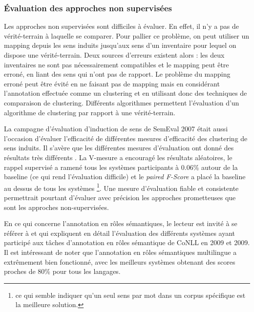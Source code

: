 \subsubsection{Évaluation des approches non supervisées}
\label{sec:evalunsupervised}

Les approches non supervisées sont difficiles à évaluer. En effet, il n'y a pas
de vérité-terrain à laquelle se comparer. Pour pallier ce problème, on peut
utiliser un mapping depuis les sens induits jusqu'aux sens d'un inventaire pour
lequel on dispose une vérité-terrain. Deux sources d'erreurs existent alors :
les deux inventaires ne sont pas nécessairement compatibles et le mapping peut
être erroné, en liant des sens qui n'ont pas de rapport. Le problème du mapping
erroné peut être évité en ne faisant pas de mapping mais en considérant
l'annotation effectuée comme un clustering et en utilisant donc des techniques
de comparaison de clustering. Différents algorithmes permettent l'évaluation
d'un algorithme de clustering par rapport à une vérité-terrain.

La campagne d'évaluation d'induction de sens de SemEval 2007
\citep{manandhar2010semeval} était aussi l'occasion d'évaluer l'efficacité de
différentes mesures d'efficacité des clustering de sens induits. Il s'avère que
les différentes mesures d'évaluation ont donné des résultats très différents
\citep{pedersen2010duluth}. La V-mesure a encouragé les résultats aléatoires,
le rappel supervisé a ramené tous les systèmes participants à 0.06\% autour de
la baseline (ce qui rend l'évaluation difficile) et le \textit{paired F-Score}
a placé la baseline au dessus de tous les systèmes \footnote{ce qui semble
indiquer qu'un seul sens par mot dans un corpus spécifique est la meilleure
solution.}. Une mesure d'évaluation fiable et consistente permettrait pourtant
d'évaluer avec précision les approches prometteuses que sont les approches
non-supervisées.

En ce qui concerne l'annotation en rôles sémantiques, le lecteur est invité à
se référer à \citep{surdeanu2008conll} et \citep{hajic2009conll} qui expliquent
en détail l'évaluation des différents systèmes ayant participé aux tâches
d'annotation en rôles sémantique de CoNLL en 2009 et 2009. Il est intéressant
de noter que l'annotation en rôles sémantiques multilingue a extrêmement bien
fonctionné, avec les meilleurs systèmes obtenant des scores proches de 80\%
pour tous les langages.


